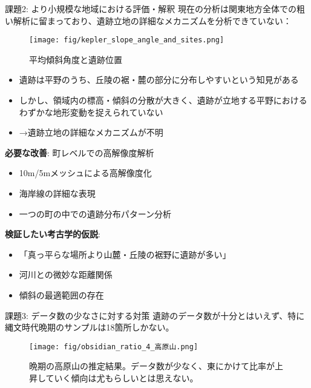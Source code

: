 \documentclass[xelatex, 8pt]{beamer}
\theoremstyle{plain}
\theoremstyle{definition}
\begin{document}
\begin{frame}{課題2: より小規模な地域における評価・解釈}
    現在の分析は関東地方全体での粗い解析に留まっており、遺跡立地の詳細なメカニズムを分析できていない：

    \vspace{3mm}

    \begin{figure}
            \centering
            \texttt{[image: fig/kepler\_slope\_angle\_and\_sites.png]}
            \caption{平均傾斜角度と遺跡位置}
            \label{fig:enter-label}
    \end{figure}

    \begin{itemize}
        \item 遺跡は平野のうち、丘陵の裾・麓の部分に分布しやすいという知見がある
        \item しかし、領域内の標高・傾斜の分散が大きく、遺跡が立地する平野におけるわずかな地形変動を捉えられていない
        \item →遺跡立地の詳細なメカニズムが不明
    \end{itemize}

    \vspace{4mm}

    \textbf{必要な改善}: 町レベルでの高解像度解析
    \begin{itemize}
        \item 10m/5mメッシュによる高解像度化
        \item 海岸線の詳細な表現
        \item 一つの町の中での遺跡分布パターン分析
    \end{itemize}

    \vspace{4mm}

    \textbf{検証したい考古学的仮説}:
    \begin{itemize}
        \item 「真っ平らな場所より山麓・丘陵の裾野に遺跡が多い」
        \item 河川との微妙な距離関係
        \item 傾斜の最適範囲の存在
    \end{itemize}
\end{frame}

\begin{frame}{課題3: データ数の少なさに対する対策}
    遺跡のデータ数が十分とはいえず、特に縄文時代晩期のサンプルは18箇所しかない。

    \vspace{3mm}

    \begin{figure}
        \centering
        \texttt{[image: fig/obsidian\_ratio\_4\_高原山.png]}
        \caption{晩期の高原山の推定結果。データ数が少なく、東にかけて比率が上昇していく傾向は尤もらしいとは思えない。}
        \label{fig:enter-label}
    \end{figure}

    \vspace{5mm}

\end{frame}
\end{document}
